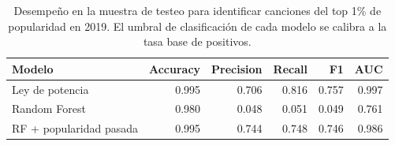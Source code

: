 \begin{table}[htbp]
\caption{Desempeño en la muestra de testeo para identificar canciones del top 1\% de popularidad en 2019. El umbral de clasificación de cada modelo se calibra a la tasa base de positivos.}
\label{tab:resultados}
\begin{tabular}{lrrrrr}
\toprule
Modelo & Accuracy & Precision & Recall & F1 & AUC \\
\midrule
Ley de potencia & 0.995 & 0.706 & 0.816 & 0.757 & 0.997 \\
Random Forest & 0.980 & 0.048 & 0.051 & 0.049 & 0.761 \\
RF + popularidad pasada & 0.995 & 0.744 & 0.748 & 0.746 & 0.986 \\
\bottomrule
\end{tabular}
\end{table}
